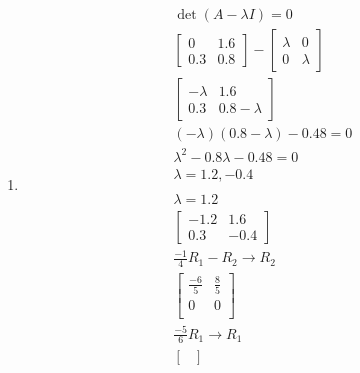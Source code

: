 \documentclass[12pt letter]{report}
\begin{document}
{\begin{enumerate}
    \item
          \begin{align*}
            \det \left( A - \lambda I \right)  = 0                                   \\
            \begin{bmatrix}
              0   & 1.6 \\
              0.3 & 0.8
            \end{bmatrix} - \begin{bmatrix} \lambda & 0 \\ 0 & \lambda \end{bmatrix} \\
            \begin{bmatrix}
              - \lambda & 1.6           \\
              0.3       & 0.8 - \lambda
            \end{bmatrix}                                                \\
            \left( - \lambda  \right) \left( 0.8 - \lambda  \right)  - 0.48 = 0      \\
            \lambda^2 - 0.8 \lambda - 0.48 = 0                                       \\
            \lambda = 1.2, -0.4                                                      \\
            \\
            \lambda = 1.2                                                            \\
            \begin{bmatrix}
              -1.2 & 1.6  \\
              0.3  & -0.4
            \end{bmatrix}                                                           \\
            \frac{-1}{4}R_1 - R_2  \rightarrow R_2                                   \\
            \begin{bmatrix}
              \frac{-6}{5} & \frac{8}{5} \\
              0            & 0           \\
            \end{bmatrix}
            \\
            \frac{-5}{6}R_1 \to R_1                                                  \\
            \begin{bmatrix}

\end{bmatrix}
\end{align*}
\end{enumerate}}
\end{document}
